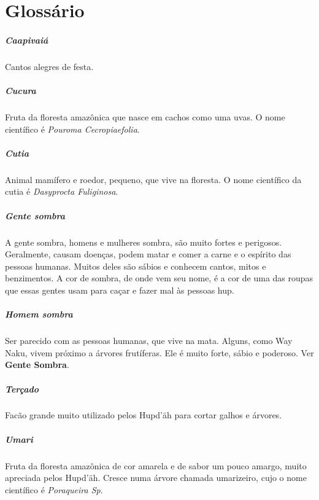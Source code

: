 \blankpage
\chapter{Glossário}


\paragraph{Caapivaiá} Cantos alegres de festa.

\paragraph{Cucura} Fruta da floresta amazônica que nasce em cachos
como uma uvas. O nome científico é \textit{Pouroma Cecropiaefolia}.

\paragraph{Cutia} Animal mamífero e roedor, pequeno, que vive na floresta. O nome
científico da cutia é \textit{Dasyprocta Fuliginosa}.

\paragraph{Gente sombra} A gente sombra, homens e mulheres sombra, são
muito fortes e perigosos. Geralmente, causam doenças, podem matar
e comer a carne e o espírito das pessoas humanas. Muitos deles
são sábios e conhecem cantos, mitos e benzimentos. A cor de
sombra, de onde vem seu nome, é a cor de uma das roupas que essas gentes
usam para caçar e fazer mal às pessoas hup.

\paragraph{Homem sombra} Ser parecido com as pessoas
humanas, que vive na mata. Alguns, como Way Naku, vivem próximo a árvores frutíferas. Ele
é muito forte, sábio e poderoso. Ver \textbf{Gente­ Sombra}.

\paragraph{Terçado} Facão grande muito utilizado pelos Hupd’äh para cortar
galhos e árvores.

\paragraph{Umari} Fruta da floresta amazônica de cor
amarela e de sabor um pouco amargo, muito apreciada pelos Hupd’äh.
Cresce numa árvore chamada umarizeiro, cujo o nome científico é \textit{Poraqueira Sp}.
